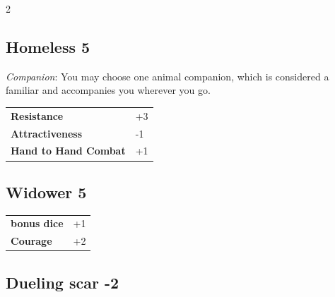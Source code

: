 \begin{multicols}{2}
\begin{tcolorbox}
\end{tcolorbox}

\begin{tcolorbox}
    \subsection*{Homeless \hfill \small{5 }}
    \tcblower
\textit{Companion}: You may choose one animal companion, which is considered a familiar and accompanies you wherever you go.


\vspace{3mm}

\begin{tabular}{@{}ll@{}}
    \textbf{Resistance} & +3\\
    \textbf{Attractiveness} & -1\\
    \textbf{Hand to Hand Combat} & +1\\
\end{tabular}


\end{tcolorbox}

\begin{tcolorbox}
    \subsection*{Widower \hfill \small{5 }}
    \tcblower




\begin{tabular}{@{}ll@{}}
    \textbf{bonus dice} & +1\\
    \textbf{Courage} & +2\\
\end{tabular}


\end{tcolorbox}

\begin{tcolorbox}
    \subsection*{Dueling scar \hfill \small{-2 }}
    \tcblower





\end{tcolorbox}
\end{multicols}
